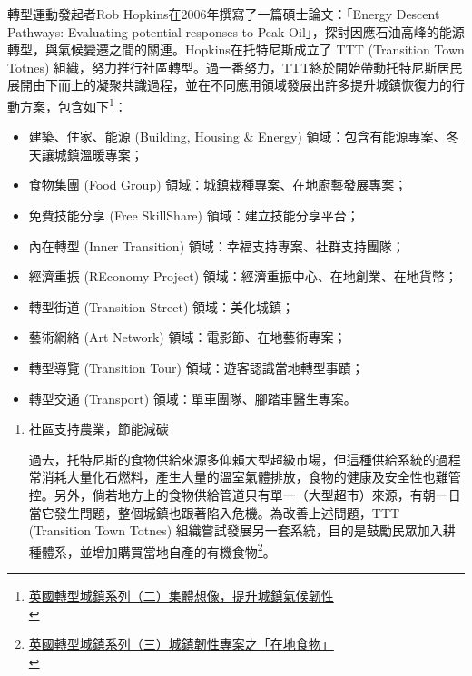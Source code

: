 \documentclass[a4paper,12pt]{article}
\begin{document}
\begin{enumerate}
轉型運動發起者Rob Hopkins在2006年撰寫了一篇碩士論文：「Energy Descent Pathways: Evaluating potential responses to Peak Oil」，探討因應石油高峰的能源轉型，與氣候變遷之間的關連。Hopkins在托特尼斯成立了 TTT (Transition Town Totnes) 組織，努力推行社區轉型。過一番努力，TTT終於開始帶動托特尼斯居民展開由下而上的凝聚共識過程，並在不同應用領域發展出許多提升城鎮恢復力的行動方案，包含如下\footnote{\href{https://lowestc.blogspot.com/2016/12/blog-post\_15.html}{英國轉型城鎮系列（二）集體想像，提升城鎮氣候韌性 }\\}：\\
\begin{itemize}
\item 建築、住家、能源 (Building, Housing \& Energy) 領域：包含有能源專案、冬天讓城鎮溫暖專案；\\
\item 食物集團 (Food Group) 領域：城鎮栽種專案、在地廚藝發展專案；\\
\item 免費技能分享 (Free SkillShare) 領域：建立技能分享平台；\\
\item 內在轉型 (Inner Transition) 領域：幸福支持專案、社群支持團隊；\\
\item 經濟重振 (REconomy Project) 領域：經濟重振中心、在地創業、在地貨幣；\\
\item 轉型街道 (Transition Street) 領域：美化城鎮；\\
\item 藝術網絡 (Art Network) 領域：電影節、在地藝術專案；\\
\item 轉型導覽 (Transition Tour) 領域：遊客認識當地轉型事蹟；\\
\item 轉型交通 (Transport) 領域：單車團隊、腳踏車醫生專案。\\
\end{itemize}
\begin{enumerate}
\item 社區支持農業，節能減碳
\label{sec:orge1f502e}

過去，托特尼斯的食物供給來源多仰賴大型超級市場，但這種供給系統的過程常消耗大量化石燃料，產生大量的溫室氣體排放，食物的健康及安全性也難管控。另外，倘若地方上的食物供給管道只有單一（大型超市）來源，有朝一日當它發生問題，整個城鎮也跟著陷入危機。為改善上述問題，TTT (Transition Town Totnes) 組織嘗試發展另一套系統，目的是鼓勵民眾加入耕種體系，並增加購買當地自產的有機食物\footnote{\href{https://lowestc.blogspot.com/2017/02/blog-post\_6.html}{英國轉型城鎮系列（三）城鎮韌性專案之「在地食物」 }\\\label{orgba1baf5}}。\\


\end{enumerate}
\end{enumerate}
\end{document}
